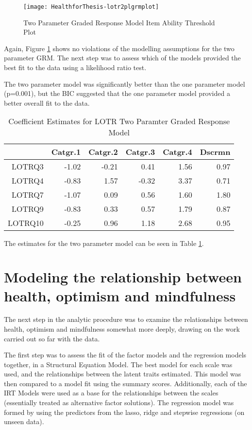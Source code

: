\documentclass{article}
\begin{document}
\begin{figure}
\texttt{[image: HealthforThesis-lotr2plgrmplot]}
  \caption{Two Parameter Graded Response Model Item Ability Threshold Plot}
  \label{fig:lotr2plgrm}
\end{figure}


Again, Figure \ref{fig:lotr2plgrm} shows no violations of the modelling assumptions for the two parameter GRM. The next step was to assess which of the models provided the best fit to the data using a likelihood ratio test.


The two parameter model was significantly better than the one parameter model (p=0.001), but the BIC suggested that the one parameter model provided a better overall fit to the data. 

\begin{table}[ht]
\centering
\begin{tabular}{rrrrrr}
  \hline
 & Catgr.1 & Catgr.2 & Catgr.3 & Catgr.4 & Dscrmn \\ 
  \hline
LOTRQ3 & -1.02 & -0.21 & 0.41 & 1.56 & 0.97 \\ 
  LOTRQ4 & -0.83 & 1.57 & -0.32 & 3.37 & 0.71 \\ 
  LOTRQ7 & -1.07 & 0.09 & 0.56 & 1.60 & 1.80 \\ 
  LOTRQ9 & -0.83 & 0.33 & 0.57 & 1.79 & 0.87 \\ 
  LOTRQ10 & -0.25 & 0.96 & 1.18 & 2.68 & 0.95 \\ 
   \hline
\end{tabular}
\caption{Coefficient Estimates for LOTR Two Paramter Graded Response Model} 
\label{tab:lotr2plestimates}
\end{table}
The estimates for the two parameter model can be seen in Table \ref{tab:lotr2plestimates}.

\section{Modeling the relationship between health, optimism and mindfulness}
\label{sec:model-relat-betw}

The next step in the analytic procedure was to examine the relationships between health, optimism and mindfulness somewhat more deeply, drawing on the work carried out so far with the data. 

The first step was to assess the fit of the factor models and the regression models together, in a Structural Equation Model. The best model for each scale was used, and the relationships between the latent traits estimated. This model was then compared to a model fit using the summary scores. Additionally, each of the IRT Models were used as a base for the relationships between the scales (essentially treated as alternative factor solutions). The regression model was formed by using the predictors from the lasso, ridge and stepwise regressions (on unseen data). 
\end{document}
